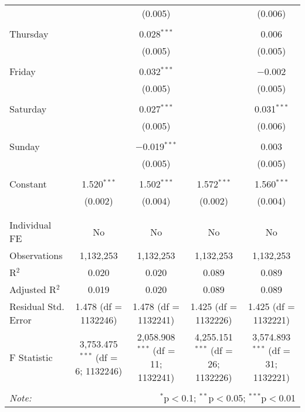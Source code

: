 \documentclass[
]{article}
\begin{document}
\begin{table}[!htbp]
{\begin{tabular}{@{\extracolsep{5pt}}lcccc}
  &  & (0.005) &  & (0.006) \\ 
  & & & & \\ 
 Thursday &  & 0.028$^{***}$ &  & 0.006 \\ 
  &  & (0.005) &  & (0.005) \\ 
  & & & & \\ 
 Friday &  & 0.032$^{***}$ &  & $-$0.002 \\ 
  &  & (0.005) &  & (0.005) \\ 
  & & & & \\ 
 Saturday &  & 0.027$^{***}$ &  & 0.031$^{***}$ \\ 
  &  & (0.005) &  & (0.006) \\ 
  & & & & \\ 
 Sunday &  & $-$0.019$^{***}$ &  & 0.003 \\ 
  &  & (0.005) &  & (0.005) \\ 
  & & & & \\ 
 Constant & 1.520$^{***}$ & 1.502$^{***}$ & 1.572$^{***}$ & 1.560$^{***}$ \\ 
  & (0.002) & (0.004) & (0.002) & (0.004) \\ 
  & & & & \\ 
\hline \\[-1.8ex] 
Individual FE & No & No & No & No \\ 
Observations & 1,132,253 & 1,132,253 & 1,132,253 & 1,132,253 \\ 
R$^{2}$ & 0.020 & 0.020 & 0.089 & 0.089 \\ 
Adjusted R$^{2}$ & 0.019 & 0.020 & 0.089 & 0.089 \\ 
Residual Std. Error & 1.478 (df = 1132246) & 1.478 (df = 1132241) & 1.425 (df = 1132226) & 1.425 (df = 1132221) \\ 
F Statistic & 3,753.475$^{***}$ (df = 6; 1132246) & 2,058.908$^{***}$ (df = 11; 1132241) & 4,255.151$^{***}$ (df = 26; 1132226) & 3,574.893$^{***}$ (df = 31; 1132221) \\ 
\hline 
\hline \\[-1.8ex] 
\textit{Note:}  & \multicolumn{4}{r}{$^{*}$p$<$0.1; $^{**}$p$<$0.05; $^{***}$p$<$0.01} \\ 
\end{tabular}
} 
\end{table} 
\newpage
\end{document}
